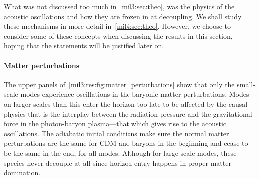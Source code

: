 













What was not discussed too much in~\cref{mil3:sec:theo}, was the physics of the acoustic oscillations and how they are frozen in at decoupling. We shall study these mechanisms in more detail in~\cref{mil4:sec:theo}. However, we choose to consider some of these concepts when discussing the results in this section, hoping that the statements will be justified later on.

\paragraph{Matter perturbations}
The upper panels of~\cref{mil3:res:fig:matter_perturbations} show that only the small-scale modes experience oscillations in the baryonic matter perturbations. Modes on larger scales than this enter the horizon too late to be affected by the causal physics that is the interplay between the radiation pressure and the gravitational force in the photon-baryon plasma---that which gives rise to the acoustic oscillations. The adiabatic initial conditions make sure the normal matter perturbations are the same for CDM and baryons in the beginning and cease to be the same in the end, for all modes. Although for large-scale modes, these species never  decouple at all since horizon entry happens in proper matter domination. 

